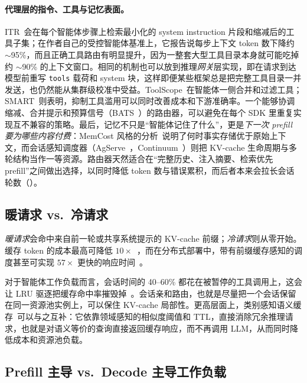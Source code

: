 \paragraph{代理层的指令、工具与记忆表面。}
ITR~\cite{itr2026}会在每个智能体步骤上检索最小化的 system instruction 片段和缩减后的工具子集；在作者自己的受控智能体基准上，它报告说每步上下文 token 数下降约 $\sim$95\%，而且正确工具路由有明显提升，因为一整套大型工具目录本身就可能吃掉约 $\sim$90\% 的上下文窗口。相同的机制也可以放到推理\emph{网关}层实现，即在请求到达模型前重写 \texttt{tools} 载荷和 system 块，这样即便某些框架总是把完整工具目录一并发送，也仍然能从集群级校准中受益。ToolScope~\cite{toolscope2025}在智能体一侧合并和过滤工具；SMART~\cite{smart2026}则表明，抑制工具滥用可以同时改善成本和下游准确率。一个能够协调缩减、合并提示和预算信号（BATS~\cite{bats2025}）的路由器，可以避免在每个 SDK 里重复实现互不兼容的策略。最后，记忆不只是“智能体记住了什么”，更是\emph{下一次 prefill 要为哪些内容付费}：MemCost 风格的分析~\cite{memcost2026}说明了何时事实存储优于原始上下文，而会话感知调度器（AgServe~\cite{agserve2025}，Continuum~\cite{continuum2025}）则把 KV-cache 生命周期与多轮结构当作一等资源。路由器天然适合在“完整历史、注入摘要、检索优先 prefill”之间做出选择，以同时降低 token 数与错误累积，而后者本来会拉长会话轮数（）。

\subsection{暖请求 vs.\ 冷请求}
\label{sec:workload:warm-cold}

\emph{暖请求}会命中来自前一轮或共享系统提示的 KV-cache 前缀；\emph{冷请求}则从零开始。缓存 token 的成本最高可降低 $10\times$~\cite{llmd2026kvcache}，而在分布式部署中，带有前缀缓存感知的调度甚至可实现 $57\times$ 更快的响应时间~\cite{llmd2026kvcache}。

对于智能体工作负载而言，会话时间的 40--60\% 都花在被暂停的工具调用上，这会让 LRU 驱逐把缓存命中率摧毁掉~\cite{vllm2026rfc37003}。会话亲和路由，也就是尽量把一个会话保留在同一资源池实例上，可以保住 KV-cache 局部性。更高层面上，类别感知语义缓存~\cite{wang2025cache}可以与之互补：它依靠领域感知的相似度阈值和 TTL，直接消除冗余推理请求，也就是对语义等价的查询直接返回缓存响应，而不再调用 LLM，从而同时降低成本和资源池负载。

\subsection{Prefill 主导 vs.\ Decode 主导工作负载}
\label{sec:workload:prefill-decode}

